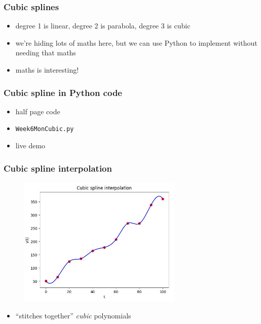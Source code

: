 \documentclass[english,14pt]{beamer}
\begin{document}

\begin{frame}[fragile]

\frametitle{Cubic splines}

\begin{itemize}
	\item degree 1 is linear, degree 2 is parabola, degree 3 is cubic
	\item we're hiding lots of maths here, but we can use Python to implement without needing that maths
	\item maths is interesting!
\end{itemize}

\end{frame}


\begin{frame}[fragile]

\frametitle{Cubic spline in Python code}

\begin{itemize}
	\item half page code
	\item \texttt{Week6MonCubic.py}
	\item live demo
\end{itemize}

\end{frame}


\begin{frame}[fragile]

\frametitle{Cubic spline interpolation}

\vspace*{-3mm}
\begin{figure}[ht]
	\centering
	\includegraphics[width=0.7\textwidth]{figures/Week6MonCubicSpline}
\end{figure}
\vspace*{-5mm}
\begin{itemize}
	\item ``stitches together'' \emph{cubic} polynomials
\end{itemize}

\end{frame}
\end{document}
